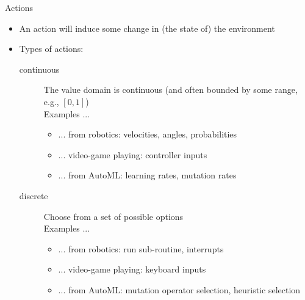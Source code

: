 \documentclass[main]{subfiles}
\begin{document}
\begin{frame}{Actions}
    \begin{itemize}
        \item An action will induce some change in (the state of) the environment\pause
        \item Types of actions:
        \begin{description}
            \item[continuous] The value domain is continuous (and often bounded by some range, e.g., $\left[0,1\right]$)\pause\\
            Examples ...
            \begin{itemize}
                \item ... from robotics: velocities, angles, probabilities
                \item ... video-game playing: controller inputs
                \item ... from AutoML: learning rates, mutation rates
            \end{itemize}
            \item[discrete] Choose from a set of possible options\pause\\
            Examples ...\\
            \begin{itemize}
                \item ... from robotics: run sub-routine, interrupts
                \item ... video-game playing: keyboard inputs
                \item ... from AutoML: mutation operator selection, heuristic selection
            \end{itemize}
        \end{description}
    \end{itemize}
\end{frame}
\end{document}

